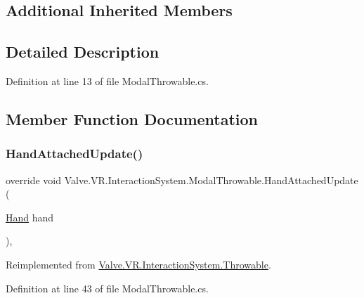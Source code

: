 \subsection*{Additional Inherited Members}


\subsection{Detailed Description}


Definition at line 13 of file Modal\+Throwable.\+cs.



\subsection{Member Function Documentation}
\mbox{\label{class_valve_1_1_v_r_1_1_interaction_system_1_1_modal_throwable_ab8c2156660c359719f3bbee9e123530d}} 
\subsubsection{\texorpdfstring{HandAttachedUpdate()}{HandAttachedUpdate()}}
{\footnotesize\ttfamily override void Valve.\+V\+R.\+Interaction\+System.\+Modal\+Throwable.\+Hand\+Attached\+Update (\begin{DoxyParamCaption}\item[{\mbox{\hyperlink{class_valve_1_1_v_r_1_1_interaction_system_1_1_hand}{Hand}}}]{hand }\end{DoxyParamCaption})\hspace{0.3cm}{\ttfamily [protected]}, {\ttfamily [virtual]}}



Reimplemented from \mbox{\hyperlink{class_valve_1_1_v_r_1_1_interaction_system_1_1_throwable_a5171da639ced71a69f5c3fa7934e99ca}{Valve.\+V\+R.\+Interaction\+System.\+Throwable}}.



Definition at line 43 of file Modal\+Throwable.\+cs.

\mbox{\label{class_valve_1_1_v_r_1_1_interaction_system_1_1_modal_throwable_abd5ac3a0dce76c872f6f4266c68c6a5b}} 
